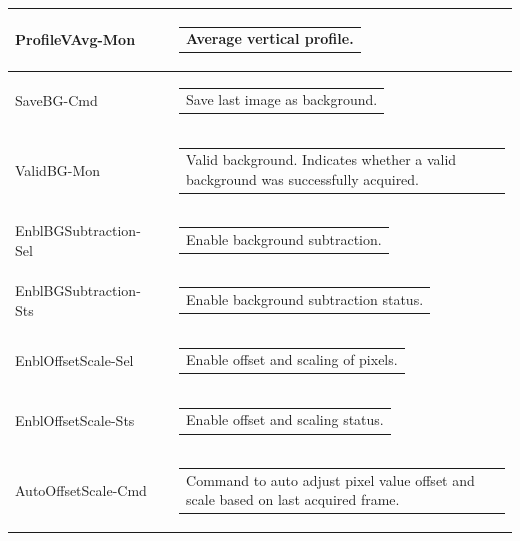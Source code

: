 \documentclass[openany]{article}
\begin{document}
\begin{longtable}{| m{3.0cm} m{4.5cm} m{7.0cm} |}
        ProfileVAvg-Mon &  & \begin{tabular}{@{}m{6cm}@{}}
                Average vertical profile.
            \end{tabular} \hypertarget{pv:save-bg}{}\\ \hline
        SaveBG-Cmd &  & \begin{tabular}{@{}m{6cm}@{}}
                Save last image as background.
            \end{tabular} \hypertarget{pv:valid-bg}{}\\ \hline
        ValidBG-Mon &  & \begin{tabular}{@{}m{6cm}@{}}
                Valid background. Indicates whether a valid background was successfully
                acquired.
            \end{tabular} \hypertarget{pv:enbl-bg-subtraction}{}\\ \hline
        EnblBGSubtraction-Sel &  & \begin{tabular}{@{}m{6cm}@{}}
                Enable background subtraction.
            \end{tabular} \\ \hline
        EnblBGSubtraction-Sts &  & \begin{tabular}{@{}m{6cm}@{}}
                Enable background subtraction status.
            \end{tabular} \hypertarget{pv:enbl-offset-scale}{}\\ \hline
        EnblOffsetScale-Sel &  & \begin{tabular}{@{}m{6cm}@{}}
                Enable offset and scaling of pixels.
            \end{tabular} \\ \hline
        EnblOffsetScale-Sts &  & \begin{tabular}{@{}m{6cm}@{}}
                Enable offset and scaling status.
            \end{tabular} \hypertarget{pv:auto-offset-scale}{}\\ \hline
        AutoOffsetScale-Cmd &  & \begin{tabular}{@{}m{6cm}@{}}
                Command to auto adjust pixel value offset and scale based on last
                acquired frame.
            \end{tabular} \hypertarget{pv:pixel-scale}{}\\ \hline

\end{longtable}
\end{document}
